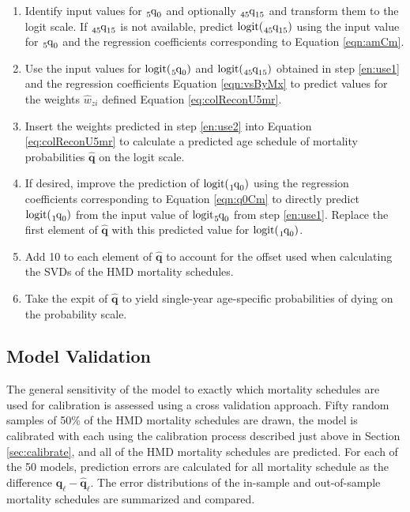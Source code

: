 \documentclass[11pt]{article}
\newcommand{\mbf}{\mathbf}
\newcommand{\qf}{\tensor*[_5]{\mbox{q}}{_0}}
\newcommand{\qoz}{\tensor*[_1]{\mbox{q}}{_0}}
\newcommand{\qff}{\tensor*[_{45}]{\mbox{q}}{_{15}}}
\newcommand{\logit}{\mbox{logit}}
\begin{document}
\begin{enumerate}

\item \label{en:use1} Identify input values for $\qf$ and optionally $\qff$ and transform them to the logit scale.  If $\qff$ is not available, predict $\logit(\qff)$ using the input value for $\qf$ and the regression coefficients corresponding to Equation  \ref{eqn:amCm}.

\item \label{en:use2} Use the input values for $\logit(\qf)$ and $\logit(\qff)$ obtained in step \ref{en:use1} and the regression coefficients  Equation \ref{eqn:vsByMx} to predict values for the weights $\widehat{w}_{zi}$ defined Equation \ref{eq:colReconU5mr}.  

\item Insert the weights predicted in step \ref{en:use2} into Equation \ref{eq:colReconU5mr}  to calculate a predicted age schedule of mortality probabilities $\widehat{\mbf{q}}$ on the logit scale.  

\item If desired, improve the prediction of $\logit(\qoz)$ using the regression coefficients  corresponding to Equation \ref{eqn:q0Cm} to directly predict $\logit(\qoz)$ from the input value of $\logit{\qf}$ from step \ref{en:use1}.  Replace the first element of $\widehat{\mbf{q}}$ with this predicted value for $\logit(\qoz)$.

\item Add 10 to each element of $\widehat{\mbf{q}}$ to account for the offset used when calculating the SVDs of the HMD mortality schedules.

\item Take the expit of $\widehat{\mbf{q}}$ to yield single-year age-specific probabilities of dying on the probability scale.

\end{enumerate}

\subsection{Model Validation}

The general sensitivity of the model to exactly which mortality schedules are used for calibration is assessed using a cross validation approach.  Fifty random samples of 50\% of the HMD mortality schedules are drawn, the model is calibrated with each using the calibration process described just above in Section \ref{sec:calibrate}, and all of the HMD mortality schedules are predicted.  For each of the 50 models, prediction errors are calculated for all mortality schedule as the difference $\mbf{q}_\ell - \widehat{\mbf{q}}_\ell$. The error distributions of the in-sample and out-of-sample mortality schedules are summarized and compared.
\end{document}
